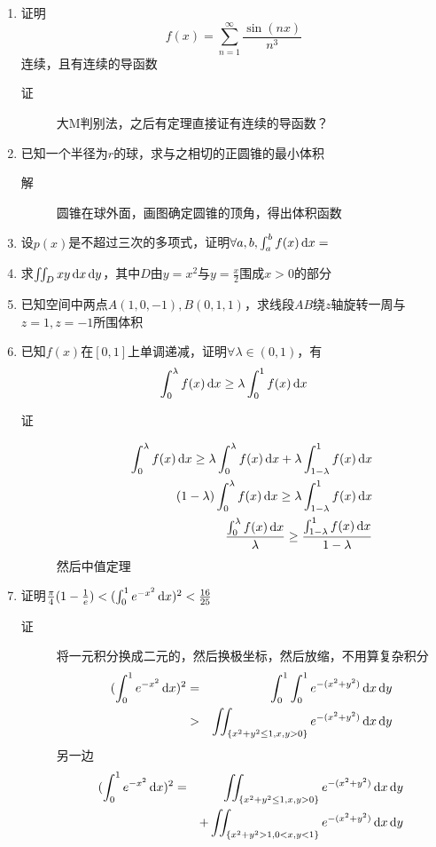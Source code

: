 \begin{enumerate}
\item 证明
\[
f(x)=\sum_{n=1}^\infty \frac{\sin(nx)}{n^3}
\]连续，且有连续的导函数
\begin{description}
\item[证] 大M判别法，之后有定理直接证有连续的导函数？
\end{description}

\item 已知一个半径为$r$的球，求与之相切的正圆锥的最小体积
\begin{description}
\item[解] 圆锥在球外面，画图确定圆锥的顶角，得出体积函数
\end{description}

\item 设$p(x)$是不超过三次的多项式，证明$\forall a,b ,\int_a^bf(x)\,\mathrm{d} x =$

\item 求$\iint_D xy\,\mathrm{d} x\,\mathrm{d} y$，其中$D$由$y=x^2$与$y=\frac{x}{2}$围成$x>0$的部分

\item 已知空间中两点$A(1,0,-1),B(0,1,1)$，求线段$AB$绕$z$轴旋转一周与$z=1,z=-1$所围体积

\item 已知$f(x)$在$[0,1]$上单调递减，证明$\forall \lambda \in (0,1)$，有
\[
\int_0^\lambda f(x)\,\mathrm{d} x \geq \lambda \int_0^1 f(x)\,\mathrm{d} x
\]
\begin{description}
\item[证]
\begin{eqnarray*}
\int_0^\lambda f(x)\,\mathrm{d} x \geq \lambda \int_0^{\lambda} f(x)\,\mathrm{d} x + \lambda \int_{1-\lambda}^1 f(x)\,\mathrm{d} x \\
(1-\lambda)\int_0^\lambda f(x)\,\mathrm{d} x \geq \lambda \int_{1-\lambda}^1 f(x)\,\mathrm{d} x \\
\frac{\int_0^\lambda f(x)\,\mathrm{d} x}{\lambda} \geq \frac{\int_{1-\lambda}^1 f(x)\,\mathrm{d} x}{1-\lambda}
\end{eqnarray*}
然后中值定理
\end{description}

\item 证明$\frac{\pi}{4}(1-\frac{1}{e})<(\int_0^1 e^{-x^2}\,\mathrm{d} x)^2<\frac{16}{25}$
\begin{description}
\item[证] 将一元积分换成二元的，然后换极坐标，然后放缩，不用算复杂积分
\begin{eqnarray*}
(\int_0^1 e^{-x^2}\,\mathrm{d} x)^2 & = & \int_0^1 \int_0^1 e^{-(x^2+y^2)}\,\mathrm{d} x\,\mathrm{d} y\\
& > & \iint_{\{x^2+y^2\leq 1,x,y>0\}}e^{-(x^2+y^2)}\,\mathrm{d} x\,\mathrm{d} y
\end{eqnarray*}
另一边
\begin{eqnarray*}
(\int_0^1 e^{-x^2}\,\mathrm{d} x)^2 & = & \iint_{\{x^2+y^2\leq 1,x,y>0\}}e^{-(x^2+y^2)}\,\mathrm{d} x\,\mathrm{d} y\\ 
& &+\iint_{\{x^2+y^2> 1,0<x,y<1\}}e^{-(x^2+y^2)}\,\mathrm{d} x\,\mathrm{d} y
\end{eqnarray*}
\end{description}


\end{enumerate}